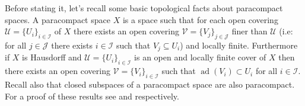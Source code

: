 \documentclass[../../main]{subfiles}
\begin{document}
Before stating it, let's recall some basic topological facts about paracompact spaces.
A paracompact space \(X\) is a space such that for each open covering \(\mathcal{U} = \{U_{i}\}_{i \in \mathcal{I}}\) of \(X\) there exists an open covering \(\mathcal{V} = \{V_{j}\}_{j \in \mathcal{J}}\) finer than \(\mathcal{U}\) (i.e: for all \(j \in \mathcal{J}\) there exists \(i \in \mathcal{I}\) such that \(V_{j} \subseteq U_{i}\)) and locally finite.
Furthermore if \(X\) is Hausdorff and \(\mathcal{U} = \{U_{i}\}_{i \in \mathcal{I}}\) is an open and locally finite cover of \(X\) then there exists an open covering \(\mathcal{V} = \{V_{i}\}_{i \in \mathcal{I}}\) such that \(\operatorname{ad}(V_{i}) \subset U_{i}\) for all \(i \in \mathcal{I}\).
Recall also that closed subspaces of a paracompact space are also paracompact.
For a proof of these results see \cite[Lemma 41.6]{munkresTopology2014} and \cite[Theorem 41.2]{munkresTopology2014} respectively.
\end{document}
